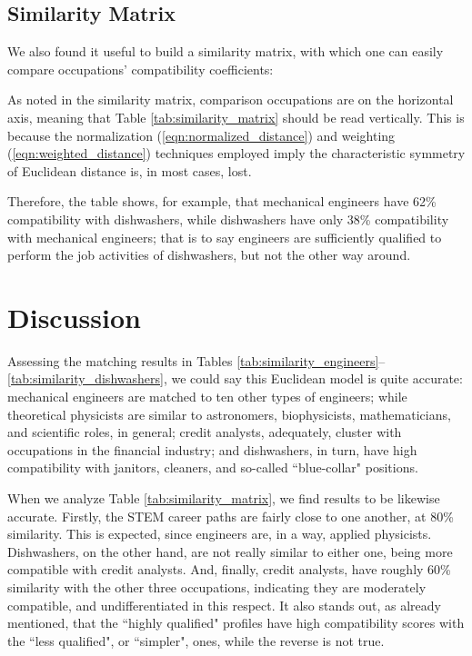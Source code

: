 \documentclass{article}
\begin{document}
\subsection{Similarity Matrix}
We also found it useful to build a similarity matrix, with which one can easily
compare occupations' compatibility coefficients: \SimilarityMatrix

As noted in the similarity matrix, comparison occupations are on the horizontal
axis, meaning that Table \ref{tab:similarity_matrix} should be read vertically.
This is because the normalization (\ref{eqn:normalized_distance}) and weighting
(\ref{eqn:weighted_distance}) techniques employed imply the characteristic
symmetry of Euclidean distance is, in most cases, lost.

Therefore, the table shows, for example, that mechanical engineers have 62\%
compatibility with dishwashers, while dishwashers have only 38\% compatibility
with mechanical engineers; that is to say engineers are sufficiently qualified
to perform the job activities of dishwashers, but not the other way around.

\section{Discussion}
Assessing the matching results in Tables
\ref{tab:similarity_engineers}--\ref{tab:similarity_dishwashers}, we could say
this Euclidean model is quite accurate: mechanical engineers are matched to ten
other types of engineers; while theoretical physicists are similar to
astronomers, biophysicists, mathematicians, and scientific roles, in general;
credit analysts, adequately, cluster with occupations in the financial
industry; and dishwashers, in turn, have high compatibility with janitors,
cleaners, and so-called ``blue-collar" positions.

When we analyze Table \ref{tab:similarity_matrix}, we find results to be
likewise accurate. Firstly, the STEM career paths are fairly close to one
another, at 80\% similarity. This is expected, since engineers are, in a way,
applied physicists. Dishwashers, on the other hand, are not really similar to
either one, being more compatible with credit analysts. And, finally, credit
analysts, have roughly 60\% similarity with the other three occupations,
indicating they are moderately compatible, and undifferentiated in this
respect. It also stands out, as already mentioned, that the ``highly qualified"
profiles have high compatibility scores with the ``less qualified", or
``simpler", ones, while the reverse is not true.
\end{document}
